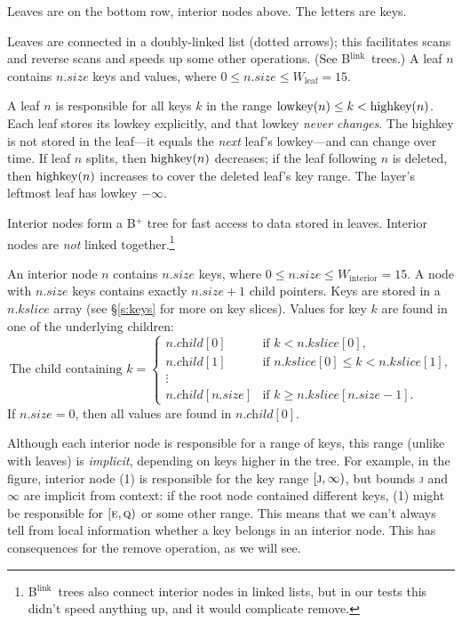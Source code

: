 \documentclass[11pt]{article}
\newcommand{\V}[1]{\textit{#1}}
\newcommand{\N}[1]{\text{\upshape{#1}}}
\newcommand{\Blink}{B\(^{\text{link}}\)}
\newcommand{\LEAFWIDTH}{\ensuremath{W_\text{leaf}}}
\newcommand{\INTERIORWIDTH}{\ensuremath{W_\text{interior}}}
\begin{document}
\noindent
Leaves are on the bottom row, interior nodes above. The letters are
keys.

Leaves are connected in a doubly-linked list (dotted arrows); this
facilitates scans and reverse scans and speeds up some other operations.
(See \Blink\ trees.) A leaf \(n\) contains \(n.\V{size}\) keys and
values, where \(0 \leq n.\V{size} \leq \LEAFWIDTH = 15\).

A leaf \(n\) is responsible for all keys \(k\) in the range
\(\N{lowkey}(n) \leq k < \N{highkey}(n)\). Each leaf stores its lowkey
explicitly, and that lowkey \emph{never changes}. The highkey is not
stored in the leaf---it equals the \emph{next} leaf's lowkey---and can
change over time. If leaf \(n\) splits, then \(\N{highkey}(n)\)
decreases; if the leaf following \(n\) is deleted, then
\(\N{highkey}(n)\) increases to cover the deleted leaf's key range. The
layer's leftmost leaf has lowkey \(-\infty\).

Interior nodes form a B$^+$ tree for fast access to data stored in
leaves. Interior nodes are \emph{not} linked
together.\footnote{\Blink\ trees also connect interior nodes in linked
lists, but in our tests this didn't speed anything up, and it would
complicate remove.}

An interior node \(n\) contains \(n.\V{size}\) keys, where \(0 \leq
n.\V{size} \leq \INTERIORWIDTH = 15\). A node with \(n.\V{size}\) keys
contains exactly \(n.\V{size} + 1\) child pointers. Keys are stored in a
\(n.\V{kslice}\) array (see \S\ref{s:keys} for more on key slices).
Values for key \(k\) are found in one of the underlying children:
%
\[
\text{The child containing \(k\)} =
\begin{cases}
n.\V{child}[0] & \text{if \(k < n.\V{kslice}[0]\),} \\
n.\V{child}[1] & \text{if \(n.\V{kslice}[0] \leq k < n.\V{kslice}[1]\),} \\
\vdots \\
n.\V{child}[n.\V{size}] & \text{if \(k \geq n.\V{kslice}[n.\V{size}-1]\).}
\end{cases}
\]
%
If \(n.\V{size} = 0\), then all values are found in \(n.\V{child}[0]\).

Although each interior node is responsible for a range of keys, this
range (unlike with leaves) is \emph{implicit}, depending on keys higher
in the tree. For example, in the figure, interior node (1) is
responsible for the key range \([\textsc{j}, \infty)\), but bounds
\textsc{j} and \(\infty\) are implicit from context: if the root node
contained different keys, (1) might be responsible for
\([\textsc{e},\textsc{q})\) or some other range. This means that we
can't always tell from local information whether a key belongs in an
interior node. This has consequences for the remove operation, as we
will see.
\end{document}
